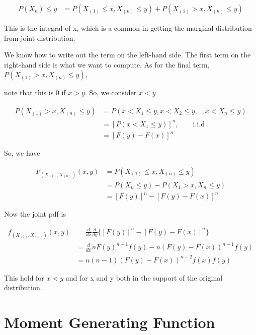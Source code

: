\begin{align*}
	P{(X_{n}) \leq y} &= P(X_{(1)} \leq x, X_{(n)} \leq y) + P(X_{(1)} > x, X_{(n)} \leq y)
\end{align*}

This is the integral of x, which is a common in getting the marginal distribution from joint distribution.

We know how to write out the term on the left-hand side. The first term on the right-hand side is what we want to compute. As for the final term, $P(X_{(1)} > x, X_{(n)} \leq y)$,

note that this is 0 if $x > y$. So, we consider $x < y$

\begin{align*}
	P(X_{(1)} > x, X_{(n)} \leq y) &= P(x < X_{1} \leq y, x < X_{2} \leq y, .., x < X_{n} \leq y) \\
	&= [P(x < X_{1} \leq y)]^n, \qquad \text{i.i.d} \\
	&= [F(y)- F(x)]^n
\end{align*}

So, we have 

\begin{align*}
	F_{(X_{(1)}, X_{(n)})} (x,y) &= P(X_{(1)} \leq x, X_{(n)} \leq y) \\
	&= P(X_{n} \leq y) - P(X_{1} > x, X_{n} \leq y) \\
	&= [F(y)]^n - [F(y)- F(x)]^n
\end{align*}

Now the joint pdf is 

\begin{align*}
	f_{(X_{(1)}, X_{(n)})} (x,y) &= \frac{d}{dx} \frac{d}{dy} \{ [F(y)]^n - [F(y)- F(x)]^n\}\\
	&= \frac{d}{dx} n F(y)^{n-1} f(y) - n(F(y)- F(x))^{n-1} f(y) \\
	&= n (n-1) (F(y)- F(x))^{n-2} f(x) f(y)
\end{align*}

This hold for $x < y$ and for x and y both in the support of the original distribution.

\section{Moment Generating Function}

